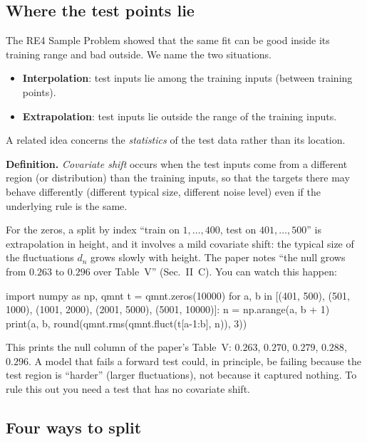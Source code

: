 \subsection{Where the test points lie}

The RE4 Sample Problem showed that the same fit can be good inside its training range and bad outside. We name the two situations.

\begin{itemize}
\item \textbf{Interpolation}: test inputs lie among the training inputs (between training points).
\item \textbf{Extrapolation}: test inputs lie outside the range of the training inputs.
\end{itemize}

A related idea concerns the \emph{statistics} of the test data rather than its location.

\textbf{Definition.} \emph{Covariate shift} occurs when the test inputs come from a different region (or distribution) than the training inputs, so that the targets there may behave differently (different typical size, different noise level) even if the underlying rule is the same.

For the zeros, a split by index ``train on $1,\dots,400$, test on $401,\dots,500$'' is extrapolation in height, and it involves a mild covariate shift: the typical size of the fluctuations $d_n$ grows slowly with height. The paper notes ``the null grows from $0.263$ to $0.296$ over Table~V'' (Sec.~II~C). You can watch this happen:

\begin{pycode}
import numpy as np, qmnt
t = qmnt.zeros(10000)
for a, b in [(401, 500), (501, 1000), (1001, 2000), (2001, 5000), (5001, 10000)]:
    n = np.arange(a, b + 1)
    print(a, b, round(qmnt.rms(qmnt.fluct(t[a-1:b], n)), 3))
\end{pycode}

This prints the null column of the paper's Table~V: $0.263$, $0.270$, $0.279$, $0.288$, $0.296$. A model that fails a forward test could, in principle, be failing because the test region is ``harder'' (larger fluctuations), not because it captured nothing. To rule this out you need a test that has no covariate shift.

\subsection{Four ways to split}

